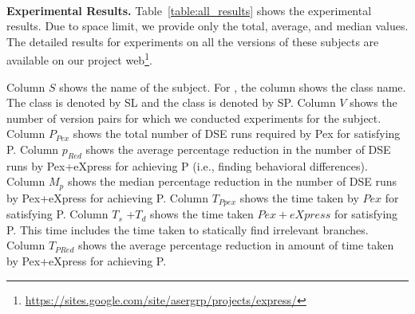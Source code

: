 \\ \textbf{Experimental Results.} 
Table~\ref{table:all_results} shows the experimental results. Due to space limit, we provide only  the total, average, and median values.
The detailed results for experiments on all the versions of these subjects are available on our project web\footnote{\url{https://sites.google.com/site/asergrp/projects/express/}}.

Column $S$ shows the name of the subject. For , the column shows the class name. The class  is denoted by SL and the class  is denoted by SP. 
Column $V$ shows the number of version pairs for which we conducted experiments for the subject. 
Column $P_{Pex}$ shows the total number of DSE runs required by Pex for satisfying P. 
Column $p_{Red}$ shows the average percentage reduction in the number of DSE runs by Pex+eXpress for achieving P (i.e., finding behavioral differences). 
Column $M_p$ shows the median percentage reduction in the number of DSE runs by Pex+eXpress for achieving P.
Column $T_{Ppex}$ shows the time taken by $Pex$ for satisfying P.
Column $T_s$ +$T_d$ shows the time taken $Pex+eXpress$ for satisfying P. This time includes the time taken to statically find irrelevant branches. 
Column $T_{PRed}$ shows the average percentage reduction in amount of time taken by Pex+eXpress for achieving P. 


